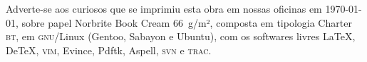 \pagebreak
\ifodd\thepage\blank\else\relax\fi

\thispagestyle{empty}
\mbox{}\vfill

\begin{adjustwidth}{.15\textwidth}{.15\textwidth}
{\noindent\centering\footnotesize
Adverte-se aos curiosos que se imprimiu esta obra em nossas oficinas em \today,
sobre papel Norbrite Book Cream 66~g/m², composta em tipologia Charter \textsc{bt}, em
\textsc{gnu}/Linux (Gentoo, Sabayon e Ubuntu), com os softwares livres \LaTeX,
De\TeX, \textsc{vim}, Evince, Pdftk, Aspell, \textsc{svn} e \textsc{trac}.\par}
\end{adjustwidth}


